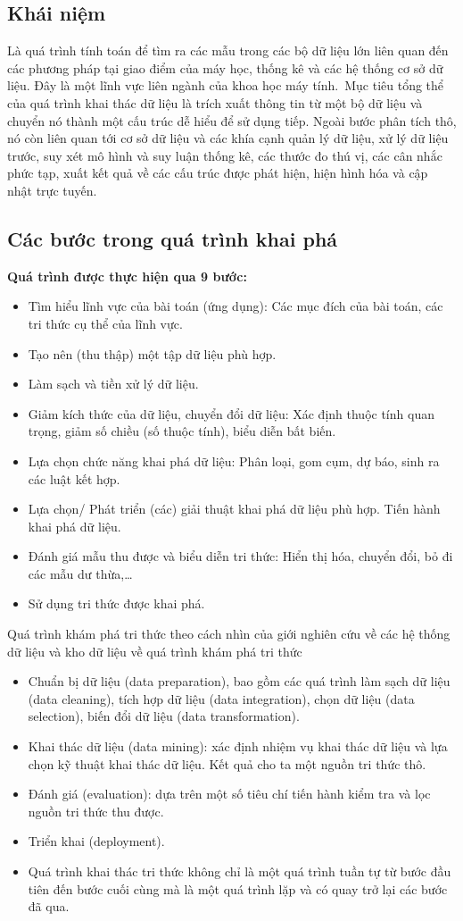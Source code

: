 \subsection{Khái niệm}
Là quá trình tính toán để tìm ra các mẫu trong các bộ dữ liệu lớn liên quan đến các phương pháp tại giao điểm của máy học, thống kê và các hệ thống cơ sở dữ liệu. 
Đây là một lĩnh vực liên ngành của khoa học máy tính. Mục tiêu tổng thể của quá trình khai thác dữ liệu là trích xuất thông tin từ một bộ dữ liệu và chuyển nó thành một cấu trúc dễ hiểu để sử dụng tiếp. 
Ngoài bước phân tích thô, nó còn liên quan tới cơ sở dữ liệu và các khía cạnh quản lý dữ liệu, xử lý dữ liệu trước, suy xét mô hình và suy luận thống kê, các thước đo thú vị, các cân nhắc phức tạp, xuất kết quả về các cấu trúc được phát hiện, hiện hình hóa và cập nhật trực tuyến.
\subsection{Các bước trong quá trình khai phá}
\textbf{Quá trình được thực hiện qua 9 bước:}
\begin{itemize}
    \item Tìm hiểu lĩnh vực của bài toán (ứng dụng): Các mục đích của bài toán,
    các tri thức cụ thể của lĩnh vực.
    \item Tạo nên (thu thập) một tập dữ liệu phù hợp.
    \item Làm sạch và tiền xử lý dữ liệu.
    \item Giảm kích thức của dữ liệu, chuyển đổi dữ liệu: Xác định thuộc tính quan
    trọng, giảm số chiều (số thuộc tính), biểu diễn bất biến.
    \item Lựa chọn chức năng khai phá dữ liệu: Phân loại, gom cụm, dự báo, sinh
    ra các luật kết hợp.
    \item Lựa chọn/ Phát triển (các) giải thuật khai phá dữ liệu phù hợp.
     Tiến hành khai phá dữ liệu.
    \item Đánh giá mẫu thu được và biểu diễn tri thức: Hiển thị hóa, chuyển đổi, bỏ
    đi các mẫu dư thừa,…
    \item Sử dụng tri thức được khai phá.
\end{itemize}
Quá trình khám phá tri thức theo cách nhìn của giới nghiên cứu về các hệ
thống dữ liệu và kho dữ liệu về quá trình khám phá tri thức
\begin{itemize}
    \item Chuẩn bị dữ liệu (data preparation), bao gồm các quá trình làm sạch dữ liệu
    (data cleaning), tích hợp dữ liệu (data integration), chọn dữ liệu (data selection),
    biến đổi dữ liệu (data transformation).
    \item Khai thác dữ liệu (data mining): xác định nhiệm vụ khai thác dữ liệu và lựa
    chọn kỹ thuật khai thác dữ liệu. Kết quả cho ta một nguồn tri thức thô.
    \item Đánh giá (evaluation): dựa trên một số tiêu chí tiến hành kiểm tra và lọc
    nguồn tri thức thu được. 
    \item Triển khai (deployment).
    \item Quá trình khai thác tri thức không chỉ là một quá trình tuần tự từ bước đầu
    tiên đến bước cuối cùng mà là một quá trình lặp và có quay trở lại các bước đã qua.
\end{itemize}
